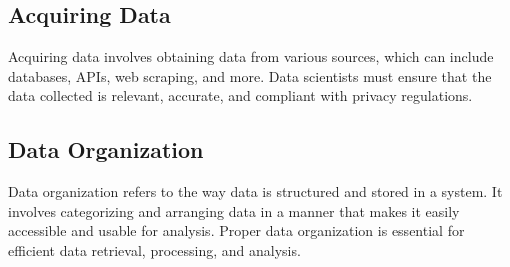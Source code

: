 \documentclass[12pt]{article}
\begin{document}
\subsection{Acquiring Data}
\begin{tcolorbox}[colback=green!5!white,colframe=green!75!black,title={Acquiring Data}]
    Acquiring data involves obtaining data from various sources, which can include databases, APIs, web scraping, and more. Data scientists must ensure that the data collected is relevant, accurate, and compliant with privacy regulations.
\end{tcolorbox}

\subsection{Data Organization}
\begin{tcolorbox}[colback=green!5!white,colframe=green!75!black,title={Acquiring Data}]
    Data organization refers to the way data is structured and stored in a system. It involves categorizing and arranging data in a manner that makes it easily accessible and usable for analysis. Proper data organization is essential for efficient data retrieval, processing, and analysis.
\end{tcolorbox}
\end{document}
